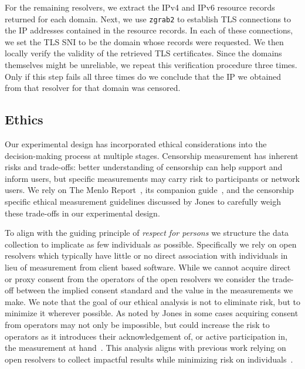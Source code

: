 For the remaining resolvers, we extract the IPv4 and IPv6 resource records
returned for each domain. Next, we use \texttt{zgrab2} to establish TLS
connections to the IP addresses contained in the resource records. In each of
these connections, we set the TLS SNI to be the domain whose records were
requested. We then locally verify the validity of the retrieved TLS
certificates.
%
Since the domains themselves might be unreliable, we repeat this verification
procedure three times. Only if this step fails all three times do we conclude
that the IP we obtained from that resolver for that domain was censored. 

\subsection{Ethics}\label{sec:methodology:ethics}
Our experimental design has incorporated ethical considerations into the
decision-making process at multiple stages.
Censorship measurement has inherent risks and trade-offs: better understanding
of censorship can help support and inform users, but specific measurements may
carry risk to participants or network users.
We rely on The Menlo Report~\cite{menlo}, its companion
guide~\cite{menlo-companion}, and the censorship specific ethical measurement
guidelines discussed by Jones \etal \cite{jones2015ethical} to 
carefully weigh these trade-offs in our experimental design.

To align with the guiding principle of \textit{respect for persons} we
structure the data collection to implicate as few individuals as possible.
Specifically we rely on open resolvers which typically have little or no direct
association with individuals in lieu of measurement from client based
software. While we cannot acquire direct or proxy consent from the operators of
the open resolvers we consider the trade-off between the implied consent
standard and the value in the measurements we make. 
We note that the goal of our ethical analysis is not to eliminate risk, but to
minimize it wherever possible. As noted by Jones \etal in some cases acquiring
consent from operators may not only be impossible, but could increase the risk to
operators as it introduces their acknowledgement of, or active participation
in, the measurement at hand~\cite{jones2015ethical}. This analysis aligns with
previous work relying on open resolvers to collect impactful results while
minimizing risk on
individuals~\cite{pearce2017global,scott2016satellite,sundara2020censored}.

